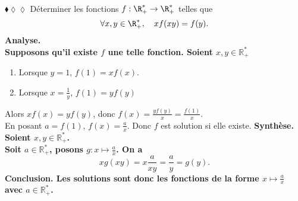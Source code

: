 \documentclass[11pt]{article}
\begin{document}
\pagebreak

\begin{exercice}{$\blacklozenge\lozenge\lozenge$}{}
    Déterminer les fonctions $f:\R_+^* \rightarrow \R_+^*$ telles que 
    \begin{equation*}
        \forall x,y \in \R^*_+, \quad xf(xy) = f(y).
    \end{equation*}
    \tcblower
    \bf{Analyse.}\\
    Supposons qu'il existe $f$ une telle fonction. Soient $x,y\in\mathbb{R}^*_+$
    \begin{enumerate}[topsep=0pt,itemsep=-0.9 ex]
        \item Lorsque $y=1$, $f(1)=xf(x)$.
        \item Lorsque $x=\frac{1}{y}$, $f(1)=yf(y)$
    \end{enumerate}
    Alors $xf(x)=yf(y)$, donc $f(x)=\frac{yf(y)}{x}=\frac{f(1)}{x}$.\\
    En posant $a=f(1)$, $f(x)=\frac{a}{x}$.
    Donc $f$ est solution si elle existe.\n
    \bf{Synthèse.}\\
    Soient $x,y\in\mathbb{R}^*_+$.\\
    Soit $a\in\mathbb{R^*_+}$, posons $g:x\mapsto\frac{a}{x}$. On a
    \begin{equation*}
        xg(xy)=x\frac{a}{xy}=\frac{a}{y}=g(y).
    \end{equation*}
    \bf{Conclusion.} Les solutions sont donc les fonctions de la forme $x\mapsto\frac{a}{x}$ avec $a\in\mathbb{R^*_+}$.
\end{exercice}
\end{document}
